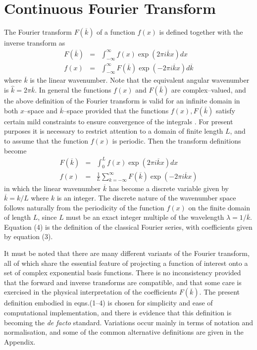 \documentclass[dvips]{article}
\begin{document}
\section*{Continuous Fourier Transform}
The Fourier transform $F(\overline{k})$ of a function $f(x)$ is defined
together with the inverse transform as
\begin{eqnarray}
F(\overline{k}) & = & \int_{-\infty}^{\infty} f(x) \exp{(2\pi i
\overline{k}x)} dx \\
f(x) & = & \int_{-\infty}^{\infty} F(\overline{k}) \exp{(-2\pi i
\overline{k}x)} d\overline{k}
\end{eqnarray}
where $\overline{k}$ is the linear wavenumber.  Note that the equivalent
angular wavenumber is $\hat{k} = 2\pi\overline{k}$.  In general the functions
$f(x)$ and $F(\bar{k})$ are complex--valued, and the above
definition of the Fourier transform is valid for an infinite domain in both
$x$--space and $\overline{k}$--space provided that the functions
$f(x),F(\bar{k})$ satisfy
certain mild constraints to ensure convergence of the integrals
\cite{brigham, lighthill}.
For present purposes it is necessary to
restrict attention to a domain of finite length $L$, and to assume that
the function $f(x)$ is periodic.  Then the transform
definitions become
\begin{eqnarray}
F(\overline{k}) & = & \int_{0}^{L} f(x) \exp{(2\pi i
\overline{k}x)} dx \\
f(x) & = & \frac{1}{L}\sum_{k=-\infty}^{\infty} F(\overline{k}) \exp{(-2\pi i
\overline{k}x)} 
\end{eqnarray}
in which the linear wavenumber $\overline{k}$ has become a discrete variable
given by $\overline{k} = k/L$ where $k$ is an integer.  The discrete
nature of the wavenumber space follows naturally from the periodicity of
the function $f(x)$ on the finite domain of length $L$, since $L$ must be an
exact integer multiple of the wavelength $\lambda = 1/\overline{k}$.
Equation (4) is the definition of the classical Fourier series, with
coefficients given by equation (3).

It must be noted that there are many different variants of the Fourier
transform, all of which share the essential feature of projecting a
function of interest onto a set of complex exponential basis functions.
There is no inconsistency provided that the forward and inverse
transforms are compatible, and that some care is exercised in the
physical interpretation of the coefficients $F(\overline{k})$.
The present definition embodied in eqns.(1--4) is chosen for simplicity
and ease of computational implementation, and there is evidence that
this definition is becoming the {\it de facto} standard. 
Variations occur mainly in terms of notation and normalisation, and some of
the common alternative definitions are given in the Appendix.
\end{document}
